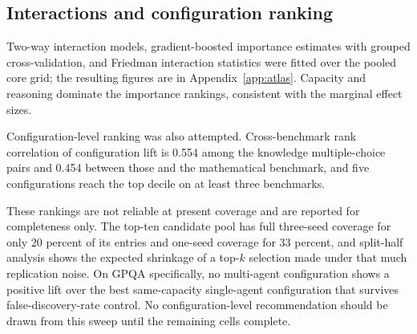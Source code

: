 \subsection{Interactions and configuration ranking}

Two-way interaction models, gradient-boosted importance estimates with grouped
cross-validation, and Friedman interaction statistics were fitted over the pooled core grid;
the resulting figures are in Appendix~\ref{app:atlas}. Capacity and reasoning dominate the
importance rankings, consistent with the marginal effect sizes.

Configuration-level ranking was also attempted. Cross-benchmark rank correlation of
configuration lift is 0.554 among the knowledge multiple-choice pairs and 0.454 between
those and the mathematical benchmark, and five configurations reach the top decile on at
least three benchmarks.

These rankings are not reliable at present coverage and are reported for completeness only.
The top-ten candidate pool has full three-seed coverage for only 20 percent of its entries
and one-seed coverage for 33 percent, and split-half analysis shows the expected shrinkage
of a top-$k$ selection made under that much replication noise. On GPQA specifically, no
multi-agent configuration shows a positive lift over the best same-capacity single-agent
configuration that survives false-discovery-rate control. No configuration-level
recommendation should be drawn from this sweep until the remaining cells complete.
